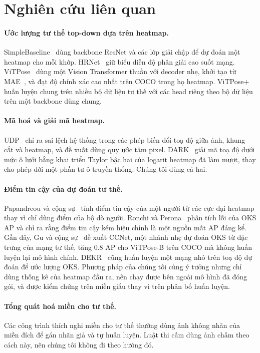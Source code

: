 \documentclass[11pt,a4paper]{article}
\begin{document}
\section{Nghiên cứu liên quan}

\paragraph{Ước lượng tư thế top-down dựa trên heatmap.} SimpleBaseline~\cite{simplebaseline} dùng backbone ResNet và các lớp giải chập để dự đoán một heatmap cho mỗi khớp. HRNet~\cite{hrnet} giữ biểu diễn độ phân giải cao suốt mạng. ViTPose~\cite{vitpose} dùng một Vision Transformer thuần với decoder nhẹ, khởi tạo từ MAE~\cite{mae}, và đạt độ chính xác cao nhất trên COCO trong họ heatmap. ViTPose+~\cite{vitposepp} huấn luyện chung trên nhiều bộ dữ liệu tư thế với các head riêng theo bộ dữ liệu trên một backbone dùng chung.

\paragraph{Mã hoá và giải mã heatmap.} UDP~\cite{udp} chỉ ra sai lệch hệ thống trong các phép biến đổi toạ độ giữa ảnh, khung cắt và heatmap, và đề xuất dùng quy ước tâm pixel. DARK~\cite{dark} giải mã toạ độ dưới mức ô lưới bằng khai triển Taylor bậc hai của logarit heatmap đã làm mượt, thay cho phép dời một phần tư ô truyền thống. Chúng tôi dùng cả hai.

\paragraph{Điểm tin cậy của dự đoán tư thế.} Papandreou và cộng sự~\cite{gpose} tính điểm tin cậy của một người từ các cực đại heatmap thay vì chỉ dùng điểm của bộ dò người. Ronchi và Perona~\cite{ronchi} phân tích lỗi của OKS AP và chỉ ra rằng điểm tin cậy kém hiệu chỉnh là một nguồn mất AP đáng kể. Gần đây, Gu và cộng sự~\cite{ccnet} đề xuất CCNet, một nhánh nhẹ dự đoán OKS từ đặc trưng của mạng tư thế, tăng 0.8 AP cho ViTPose-B trên COCO mà không huấn luyện lại mô hình chính. DEKR~\cite{dekr} cũng huấn luyện một mạng nhỏ trên toạ độ dự đoán để ước lượng OKS. Phương pháp của chúng tôi cùng ý tưởng nhưng chỉ dùng thống kê của heatmap đầu ra, nên chạy được bên ngoài mô hình đã đóng gói, và được kiểm chứng trên miền giấu thay vì trên phân bố huấn luyện.

\paragraph{Tổng quát hoá miền cho tư thế.} Các công trình thích nghi miền cho tư thế thường dùng ảnh không nhãn của miền đích để gán nhãn giả và tự huấn luyện. Luật thi cấm dùng ảnh chấm theo cách này, nên chúng tôi không đi theo hướng đó.
\end{document}
